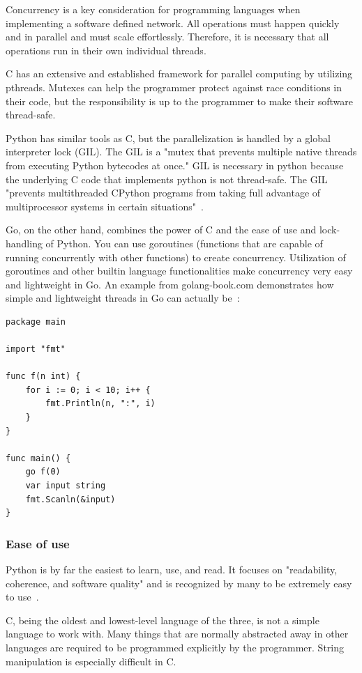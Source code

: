 \documentclass[10pt,letterpaper,onecolumn,draftclsnofoot]{IEEEtran}
\begin{document}
Concurrency is a key consideration for programming languages when implementing a
software defined network. All operations must happen quickly and in parallel and
must scale effortlessly. Therefore, it is necessary that all operations run in
their own individual threads.

C has an extensive and established framework for parallel computing by utilizing
pthreads. Mutexes can help the programmer protect against race conditions in
their code, but the responsibility is up to the programmer to make their
software thread-safe.

Python has similar tools as C, but the parallelization is handled by a global
interpreter lock (GIL). The GIL is a "mutex that prevents multiple native
threads from executing Python bytecodes at once." GIL is necessary in python
because the underlying C code that implements python is not thread-safe. The GIL
"prevents multithreaded CPython programs from taking full advantage of
multiprocessor systems in certain situations"~\cite{GIL}.

Go, on the other hand, combines the power of C and the ease of use and
lock-handling of Python. You can use goroutines (functions that are capable of
running concurrently with other functions) to create concurrency. Utilization of
goroutines and other builtin language functionalities make concurrency very easy
and lightweight in Go. An example from golang-book.com demonstrates how simple
and lightweight threads in Go can actually be~\cite{goroutines}:

\begin{lstlisting}
package main

import "fmt"

func f(n int) {
	for i := 0; i < 10; i++ {
		fmt.Println(n, ":", i)
	}
}

func main() {
	go f(0)
	var input string
	fmt.Scanln(&input)
}
\end{lstlisting}

\subsubsection{Ease of use}

Python is by far the easiest to learn, use, and read. It focuses on
"readability, coherence, and software quality" and is recognized by many to be
extremely easy to use~\cite{learningpython}.

C, being the oldest and lowest-level language of the three, is not a simple
language to work with. Many things that are normally abstracted away in other
languages are required to be programmed explicitly by the programmer. String
manipulation is especially difficult in C.
\end{document}
